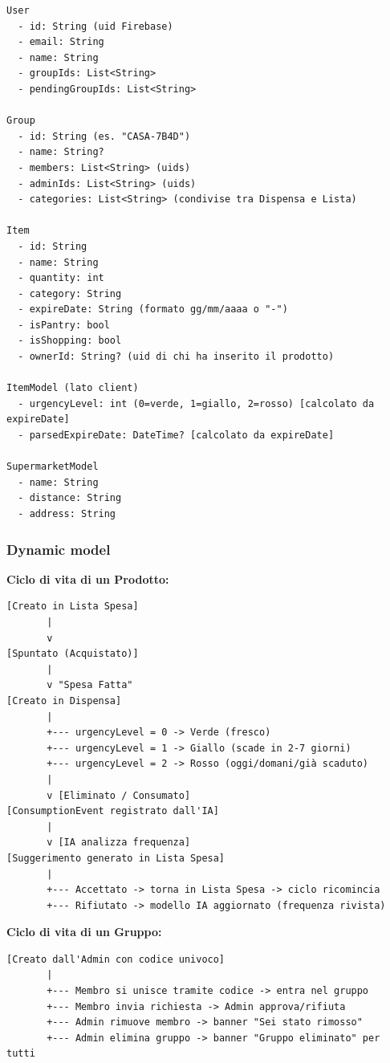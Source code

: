 \documentclass[12pt,a4paper]{article}
\begin{document}
\begin{verbatim}
User
  - id: String (uid Firebase)
  - email: String
  - name: String
  - groupIds: List<String>
  - pendingGroupIds: List<String>

Group
  - id: String (es. "CASA-7B4D")
  - name: String?
  - members: List<String> (uids)
  - adminIds: List<String> (uids)
  - categories: List<String> (condivise tra Dispensa e Lista)

Item
  - id: String
  - name: String
  - quantity: int
  - category: String
  - expireDate: String (formato gg/mm/aaaa o "-")
  - isPantry: bool
  - isShopping: bool
  - ownerId: String? (uid di chi ha inserito il prodotto)

ItemModel (lato client)
  - urgencyLevel: int (0=verde, 1=giallo, 2=rosso) [calcolato da expireDate]
  - parsedExpireDate: DateTime? [calcolato da expireDate]

SupermarketModel
  - name: String
  - distance: String
  - address: String
\end{verbatim}

\subsubsection{Dynamic model}

\textbf{Ciclo di vita di un Prodotto:}

\begin{verbatim}
[Creato in Lista Spesa]
       |
       v
[Spuntato (Acquistato)]
       |
       v "Spesa Fatta"
[Creato in Dispensa]
       |
       +--- urgencyLevel = 0 -> Verde (fresco)
       +--- urgencyLevel = 1 -> Giallo (scade in 2-7 giorni)
       +--- urgencyLevel = 2 -> Rosso (oggi/domani/già scaduto)
       |
       v [Eliminato / Consumato]
[ConsumptionEvent registrato dall'IA]
       |
       v [IA analizza frequenza]
[Suggerimento generato in Lista Spesa]
       |
       +--- Accettato -> torna in Lista Spesa -> ciclo ricomincia
       +--- Rifiutato -> modello IA aggiornato (frequenza rivista)
\end{verbatim}

\textbf{Ciclo di vita di un Gruppo:}

\begin{verbatim}
[Creato dall'Admin con codice univoco]
       |
       +--- Membro si unisce tramite codice -> entra nel gruppo
       +--- Membro invia richiesta -> Admin approva/rifiuta
       +--- Admin rimuove membro -> banner "Sei stato rimosso"
       +--- Admin elimina gruppo -> banner "Gruppo eliminato" per tutti
\end{verbatim}
\end{document}
